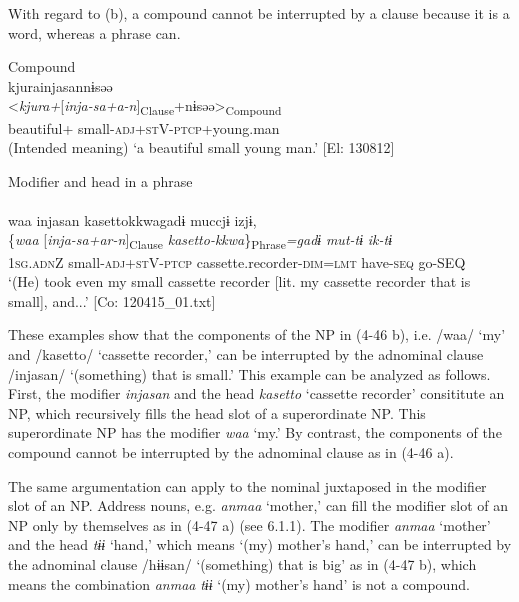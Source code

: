 With regard to (b), a compound cannot be interrupted by a clause because it is a word, whereas a phrase can.

\ea \label{ex:4.46} \ea  Compound \label{ex:4.46a}\\
\glll      *kjurainjasannɨsəə\\
      <\textit{kjura+}[\textit{inja-sa+a-n}]\textsubscript{Clause}+nɨsəə>\textsubscript{Compound}\\
      beautiful+ small-\textsc{adj}+\textsc{st}V-\textsc{ptcp}+young.man\\
    \glt       (Intended meaning) ‘a beautiful small young man.’ [El: 130812]

  \ex Modifier and head in a phrase\\\\
\glll     waa  injasan  {\textbar}kasetto{\textbar}kkwagadɨ  muccjɨ  izjɨ,  \\
      \{\textit{waa}  [\textit{inja-sa+ar-n}]\textsubscript{Clause} \textit{kasetto-kkwa}\}\textsubscript{Phrase}\textit{=gadɨ}   \textit{mut-tɨ}  \textit{ik-tɨ}  \\
      1\textsc{sg}.\textsc{adn}Z  small-\textsc{adj}+\textsc{st}V-\textsc{ptcp}  cassette.recorder-\textsc{dim}=\textsc{lmt}  have-\textsc{seq}  go-SEQ        \\
    \glt       ‘(He) took even my small cassette recorder [lit. my cassette recorder that is small], and...’ [Co: 120415\_01.txt]
    \z
\z

These examples show that the components of the NP in (4-46 b), i.e. /waa/ ‘my’ and /kasetto/ ‘cassette recorder,’ can be interrupted by the adnominal clause /injasan/ ‘(something) that is small.’ This example can be analyzed as follows. First, the modifier \textit{injasan} and the head \textit{kasetto} ‘cassette recorder’ consititute an NP, which recursively fills the head slot of a superordinate NP. This superordinate NP has the modifier \textit{waa} ‘my.’ By contrast, the components of the compound cannot be interrupted by the adnominal clause as in (4-46 a).

The same argumentation can apply to the nominal juxtaposed in the modifier slot of an NP. Address nouns, e.g. \textit{anmaa} ‘mother,’ can fill the modifier slot of an NP only by themselves as in (4-47 a) (see 6.1.1). The modifier \textit{anmaa} ‘mother’ and the head \textit{tɨɨ} ‘hand,’ which means ‘(my) mother’s hand,’ can be interrupted by the adnominal clause /hɨɨsan/ ‘(something) that is big’ as in (4-47 b), which means the combination \textit{anmaa} \textit{tɨɨ} ‘(my) mother’s hand’ is not a compound.

